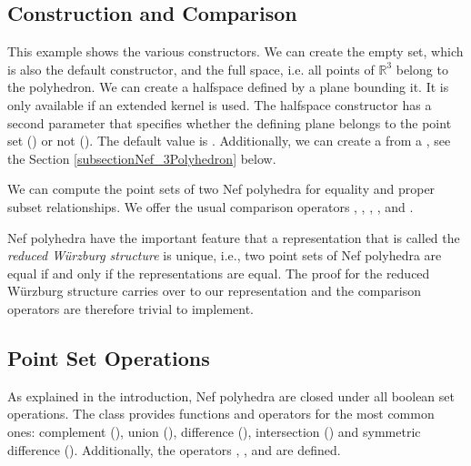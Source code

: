 
\subsection{Construction and Comparison}

This example shows the various constructors. We can create the empty
set, which is also the default constructor, and the full space, i.e.
all points of $\mathbb{R}^3$ belong to the polyhedron. We can create a
halfspace defined by a plane bounding it. It is only available if an
extended kernel is used. The halfspace constructor has a second
parameter that specifies whether the defining plane belongs to the
point set () or not
(). The default value is
. Additionally, we can create a
 from a , see the Section
\ref{subsectionNef_3Polyhedron} below.

We can compute the point sets of two Nef polyhedra for equality and
proper subset relationships. We offer the usual comparison operators
\ccc{==}, \ccc{!=}, \ccc{<=}, \ccc{>=}, \ccc{<} and \ccc{>}. 

Nef polyhedra have the important feature that a representation that is
called the \emph{reduced W\"urzburg structure} is unique, i.e., two
point sets of Nef polyhedra are equal if and only if the
representations are equal. The proof for the reduced W\"urzburg
structure carries over to our representation and the comparison
operators are therefore trivial to implement.


\subsection{Point Set Operations}

As explained in the introduction, Nef polyhedra are closed under all
boolean set operations. The class  provides
functions and operators for the most common ones: complement
(), union (), difference
(), intersection () and symmetric
difference (). Additionally, the operators \ccc{*=},
\ccc{-=}, \ccc{*=} and \ccc{^=} are defined.

